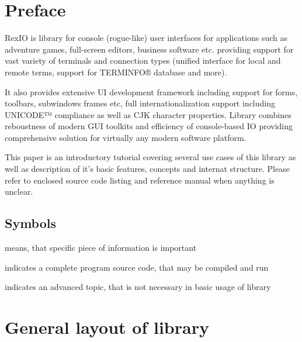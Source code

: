 

\pagebreak
\section*{Preface}
 RexIO is library for console (rogue-like) user interfaces for
 applications such as adventure games, full-screen editors, business
 software etc. providing support for vast variety of terminals and
 connection types (unified interface for local and remote terms,
 support for TERMINFO® database and more).  

 It also provides extensive UI development framework including support
 for forms, toolbars, subwindows frames etc, full internationalization
 support including UNICODE™ compliance as well as CJK character
 properties. Library combines reboustness of modern GUI toolkits and
 efficiency of console-based IO providing comprehensive solution for
 virtually any modern software platform.

 This paper is an introductory tutorial covering several use cases of
 this library as well as description of it's basic features, concepts
 and internat structure. Please refer to enclosed source code listing
 and reference manual when anything is unclear.
 
 \vspace{\fill}
\pagebreak
 \subsection*{Symbols}
 \important means, that specific piece of information is important
 \vspace{0.4cm}

 \fullcode indicates a complete program source code, that may be
 compiled and run
 \vspace{0.4cm}

 \advanced indicates an advanced topic, that is not necessary in basic
 usage of library
 \vspace{\fill}
\pagebreak
\tableofcontents 
 \vspace{\fill}\cleardoublepage
\lstset{commentstyle=\textit,stepnumber=1 ,keywordstyle=\bfseries,
    showstringspaces=false}
\lstset{numbers=left,numbersep=0.1cm,numberstyle=\tt,tabsize=4,
    basicstyle=\tt\footnotesize,texcl=false}
\lstset{language=C++,breaklines=true}
\pagestyle{headings}
\section{General layout of library}

\cleardoublepage
